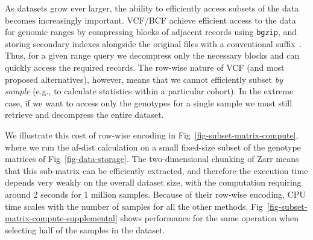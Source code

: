 \documentclass[a4paper,num-refs]{oup-contemporary}
\begin{document}
As datasets grow ever larger, the ability to efficiently access subsets 
of the data becomes increasingly important. VCF/BCF achieve efficient 
access to the data for genomic ranges 
by compressing blocks of adjacent records using \texttt{bgzip},
and storing secondary indexes alongside the original 
files with a conventional suffix~\citep{li2011tabix}. 
Thus, for a given range query we 
decompress only the necessary blocks and can quickly access
the required records. 
The row-wise nature of VCF (and most proposed alternatives), however, means
that we cannot efficiently subset \emph{by sample}
(e.g., to calculate statistics within a particular cohort). In the extreme
case, if we want to access only the genotypes for a single sample
we must still retrieve and decompress the entire dataset.

We illustrate this cost of row-wise encoding in
Fig~\ref{fig-subset-matrix-compute}, where we run the af-dist calculation
on a small fixed-size subset of the genotype matrices of
Fig~\ref{fig-data-storage}. The two-dimensional chunking of Zarr
means that this sub-matrix can be efficiently
extracted, and therefore the execution time depends very weakly on 
the overall dataset size, with the computation requiring around
2 seconds for 1 million samples. Because of their 
row-wise encoding, CPU time scales with the number of samples
for all the other methods.
Fig~\ref{fig-subset-matrix-compute-supplemental} shows performance
for the same operation when selecting half of the samples in the 
dataset.
\end{document}

